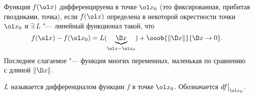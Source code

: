 \label{diffM}
	 Функция $f(\ol x)$ дифференцируема в точке $\ol x_0$ (это фиксированная, прибитая гвоздиками, точка), если
	 $f(\ol x)$ определена в некоторой окрестности точки $\ol x_0$ и $\exists\ L$ "--- линейный функционал такой, что
	 \[f(\ol x) - f(\ol x_0) = L(\underbrace{\D x}_{\ol x- \ol x_0}) + \ooob{\|\D x\|}{\D x\to 0}.\]
	 Последнее слагаемое "--- функция многих переменных, маленькая по сравнению с длиной $\|\D x\|$.
	 
	 $L$ называется дифференциалом функции $f$ в точке $\ol x_0$. Обозначается $df\big|_{\ol x_0}$.
	 